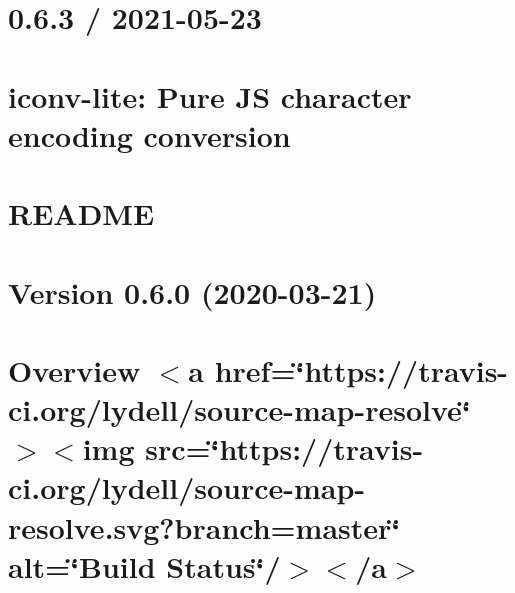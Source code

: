 \documentclass[twoside]{book}
\newcommand{\+}{\discretionary{\mbox{\scriptsize$\hookleftarrow$}}{}{}}
\begin{document}
\chapter{0.6.3 / 2021-\/05-\/23}
\label{md__c___users_vaishnavi_jadhav__desktop__developer_code_mean_stack_example_client_node_modules_s43b800c32de450925b3374c8de27ec47}

\chapter{iconv-\/lite\+: Pure JS character encoding conversion}
\label{md__c___users_vaishnavi_jadhav__desktop__developer_code_mean_stack_example_client_node_modules_s2d6ea9f724dcf5c0a4023b7b7f836247}

\chapter{README}
\label{md__c___users_vaishnavi_jadhav__desktop__developer_code_mean_stack_example_client_node_modules_source_map_loader__r_e_a_d_m_e}

\chapter{Version 0.6.0 (2020-\/03-\/21)}
\label{md__c___users_vaishnavi_jadhav__desktop__developer_code_mean_stack_example_client_node_modules_source_map_resolve_changelog}

\chapter{Overview \texorpdfstring{$<$}{<}a href=\char`\"{}https\+://travis-\/ci.\+org/lydell/source-\/map-\/resolve\char`\"{} \texorpdfstring{$>$}{>}\texorpdfstring{$<$}{<}img src=\char`\"{}https\+://travis-\/ci.\+org/lydell/source-\/map-\/resolve.\+svg?branch=master\char`\"{} alt=\char`\"{}\+Build Status\char`\"{}/\texorpdfstring{$>$}{>}\texorpdfstring{$<$}{<}/a\texorpdfstring{$>$}{>}}
\label{md__c___users_vaishnavi_jadhav__desktop__developer_code_mean_stack_example_client_node_modules_source_map_resolve_readme}

\end{document}
